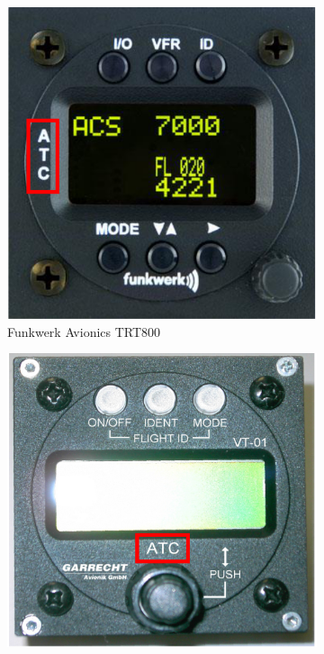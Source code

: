 \documentclass{article}
\begin{document}
\begin{figure}
\centering
\begin{subfigure}[b]{0.24\textwidth}
	\includegraphics[width=\textwidth]{trt800}
	\caption{{Funkwerk} Avionics TRT800}
	\label{fig:trt800}
\end{subfigure}
\begin{subfigure}[b]{0.24\textwidth}
	\includegraphics[width=\textwidth]{vt01}

\end{subfigure}
\end{figure}
\end{document}
